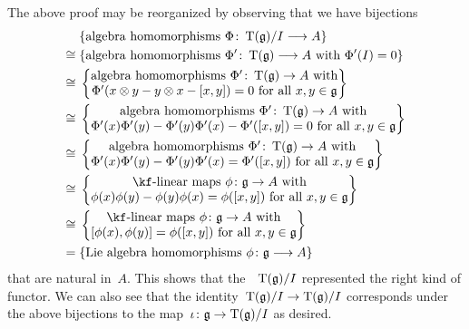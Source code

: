 \begin{remark}
  The above proof may be reorganized by observing that we have bijections
  \begin{align*}
    {}&
    \{ \text{algebra homomorphisms~$\Phi \colon \Tensor(\glie)/I \to A$} \}
    \\
    \cong{}&
    \{ \text{algebra homomorphisms~$\Phi' \colon \Tensor(\glie) \to A$ with~$\Phi'(I) = 0$} \}
    \\
    \cong{}&
    \left\{
      \begin{tabular}{@{}c@{}}
        algebra homomorphisms~$\Phi' \colon \Tensor(\glie) \to A$ with  \\
        $\Phi'(x \tensor y - y \tensor x - [x,y]) = 0$ for all~$x, y \in \glie$
      \end{tabular}
    \right\}
    \\
    \cong{}&
    \left\{
      \begin{tabular}{@{}c@{}}
        algebra homomorphisms~$\Phi' \colon \Tensor(\glie) \to A$ with  \\
        $\Phi'(x) \Phi'(y) - \Phi'(y) \Phi'(x) - \Phi'([x,y]) = 0$ for all~$x, y \in \glie$
      \end{tabular}
    \right\}
    \\
    \cong{}&
    \left\{
      \begin{tabular}{@{}c@{}}
        algebra homomorphisms~$\Phi' \colon \Tensor(\glie) \to A$ with  \\
        $\Phi'(x) \Phi'(y) - \Phi'(y) \Phi'(x) = \Phi'([x,y])$ for all~$x, y \in \glie$
      \end{tabular}
    \right\}
    \\
    \cong{}&
    \left\{
      \begin{tabular}{@{}c@{}}
        {\linear{$\kf$}} maps~$\phi \colon \glie \to A$ with  \\
        $\phi(x) \phi(y) - \phi(y) \phi(x) = \phi([x,y])$ for all~$x, y \in \glie$
      \end{tabular}
    \right\}
    \\
    \cong{}&
    \left\{
      \begin{tabular}{@{}c@{}}
        {\linear{$\kf$}} maps~$\phi \colon \glie \to A$ with  \\
        $[\phi(x), \phi(y)] = \phi([x,y])$ for all~$x, y \in \glie$ 
      \end{tabular}
    \right\}
    \\
    ={}&
    \{ \text{Lie~algebra homomorphisms~$\phi \colon \glie \to A$} \}
  \end{align*}
  that are natural in~$A$.
  This shows that the~{\algebra{$\kf$}}~$\operatorname{T}(\mathfrak{g})/I$ represented the right kind of functor.
  We can also see that the identity~$\Tensor(\glie)/I \to \Tensor(\glie)/I$ corresponds under the above bijections to the map~$\iota \colon \glie \to \Tensor(\glie)/I$ as desired.
\end{remark}










